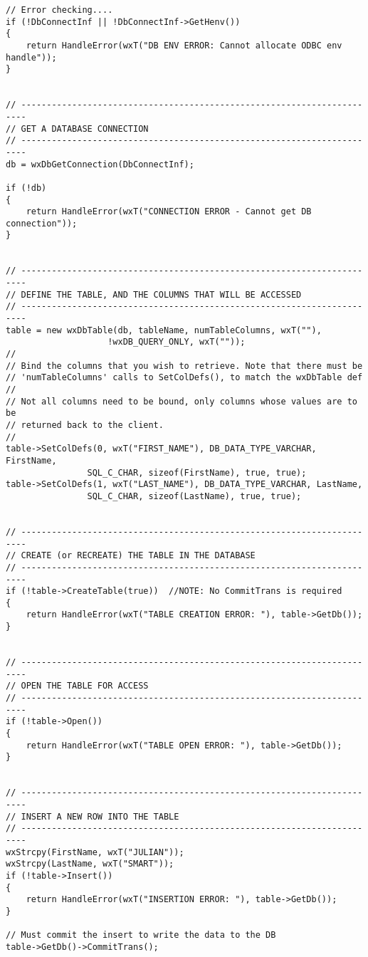 \begin{verbatim}
// Error checking....
if (!DbConnectInf || !DbConnectInf->GetHenv())
{
    return HandleError(wxT("DB ENV ERROR: Cannot allocate ODBC env handle"));
}


// -----------------------------------------------------------------------
// GET A DATABASE CONNECTION
// -----------------------------------------------------------------------
db = wxDbGetConnection(DbConnectInf);

if (!db)
{
    return HandleError(wxT("CONNECTION ERROR - Cannot get DB connection"));
}


// -----------------------------------------------------------------------
// DEFINE THE TABLE, AND THE COLUMNS THAT WILL BE ACCESSED
// -----------------------------------------------------------------------
table = new wxDbTable(db, tableName, numTableColumns, wxT(""), 
                    !wxDB_QUERY_ONLY, wxT(""));
//
// Bind the columns that you wish to retrieve. Note that there must be
// 'numTableColumns' calls to SetColDefs(), to match the wxDbTable def
//
// Not all columns need to be bound, only columns whose values are to be 
// returned back to the client.
//
table->SetColDefs(0, wxT("FIRST_NAME"), DB_DATA_TYPE_VARCHAR, FirstName,
                SQL_C_CHAR, sizeof(FirstName), true, true);
table->SetColDefs(1, wxT("LAST_NAME"), DB_DATA_TYPE_VARCHAR, LastName,
                SQL_C_CHAR, sizeof(LastName), true, true);


// -----------------------------------------------------------------------
// CREATE (or RECREATE) THE TABLE IN THE DATABASE
// -----------------------------------------------------------------------
if (!table->CreateTable(true))  //NOTE: No CommitTrans is required
{
    return HandleError(wxT("TABLE CREATION ERROR: "), table->GetDb());
}


// -----------------------------------------------------------------------
// OPEN THE TABLE FOR ACCESS
// -----------------------------------------------------------------------
if (!table->Open())
{
    return HandleError(wxT("TABLE OPEN ERROR: "), table->GetDb());
}


// -----------------------------------------------------------------------
// INSERT A NEW ROW INTO THE TABLE
// -----------------------------------------------------------------------
wxStrcpy(FirstName, wxT("JULIAN"));
wxStrcpy(LastName, wxT("SMART"));
if (!table->Insert())
{
    return HandleError(wxT("INSERTION ERROR: "), table->GetDb());
}

// Must commit the insert to write the data to the DB
table->GetDb()->CommitTrans();



\end{verbatim}
